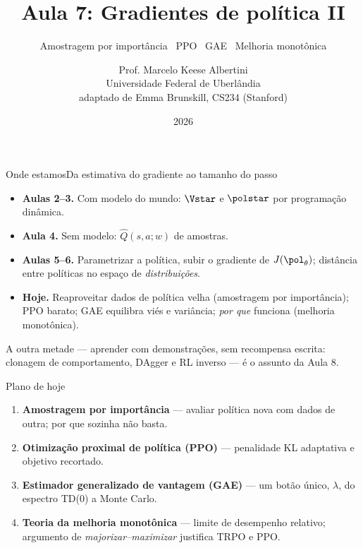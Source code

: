 \documentclass[aspectratio=169, 10pt]{beamer}
\title[Aula 7 — PPO e GAE]{Aula 7: Gradientes de política II}
\subtitle[Aprendizagem por Reforço]{Amostragem por importância \textbullet\ PPO \textbullet\ GAE \textbullet\ Melhoria monotônica}
\author[Prof. Marcelo K. Albertini]{Prof. Marcelo Keese Albertini \\
  \footnotesize Universidade Federal de Uberlândia \\
  \footnotesize adaptado de Emma Brunskill, CS234 (Stanford)}
\institute{Universidade Federal de Uberlândia}
\date{2026}
\newcommand{\thv}{\theta}
\newcommand{\polth}{\pol_{\thv}}
\newcommand{\Qhat}{\hat{Q}}
\begin{document}
\begin{frame}\titlepage\end{frame}

\begin{frame}{Onde estamos}{Da estimativa do gradiente ao tamanho do passo}

  \begin{itemize}
    \item \textbf{Aulas 2--3.} Com modelo do mundo: $\Vstar$ e $\polstar$ por
      programação dinâmica.
    \item \textbf{Aula 4.} Sem modelo: $\Qhat(s,a;w)$ de amostras.
    \item \textbf{Aulas 5--6.} Parametrizar a política, subir o gradiente de
      $J(\polth)$; distância entre políticas no espaço de \emph{distribuições}.
    \item \textbf{Hoje.} Reaproveitar dados de política velha
      (\alert{amostragem por importância}); \alert{PPO} barato; \alert{GAE}
      equilibra viés e variância; \emph{por que} funciona (melhoria monotônica).
  \end{itemize}

  \begin{ideiabox}
    A outra metade --- aprender com \alert{demonstrações}, sem recompensa escrita:
    clonagem de comportamento, DAgger e RL inverso --- é o assunto da Aula 8.
  \end{ideiabox}
\end{frame}

\begin{frame}{Plano de hoje}

  \begin{enumerate}
    \item \textbf{Amostragem por importância} --- avaliar política nova com dados de
      outra; por que sozinha não basta.
    \item \textbf{Otimização proximal de política (PPO)} --- penalidade KL adaptativa
      e objetivo recortado.
    \item \textbf{Estimador generalizado de vantagem (GAE)} --- um botão único,
      $\lambda$, do espectro TD(0) a Monte Carlo.
    \item \textbf{Teoria da melhoria monotônica} --- limite de desempenho relativo;
      argumento de \emph{majorizar--maximizar} justifica TRPO e PPO.
  \end{enumerate}
\end{frame}
\end{document}
